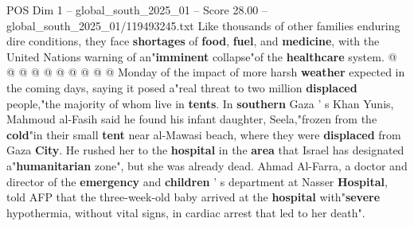\begin{textsample}{POS Dim 1 – global\_south\_2025\_01 – Score 28.00 – global\_south\_2025\_01/119493245.txt}
Like thousands of other families enduring dire conditions, they face \textbf{shortages} of \textbf{food}, \textbf{fuel}, and \textbf{medicine}, with the United Nations warning of an"\textbf{imminent} collapse"of the \textbf{healthcare} system. @ @ @ @ @ @ @ @ @ @ Monday of the impact of more harsh \textbf{weather} expected in the coming days, saying it posed a"real threat to two million \textbf{displaced} people,"the majority of whom live in \textbf{tents}.
In \textbf{southern} Gaza ' s Khan Yunis, Mahmoud al-Fasih said he found his infant daughter, Seela,"frozen from the \textbf{cold}"in their small \textbf{tent} near al-Mawasi beach, where they were \textbf{displaced} from Gaza \textbf{City}.
He rushed her to the \textbf{hospital} in the \textbf{area} that Israel has designated a"\textbf{humanitarian} zone", but she was already dead.
Ahmad Al-Farra, a doctor and director of the \textbf{emergency} and \textbf{children} ' s department at Nasser \textbf{Hospital}, told AFP that the three-week-old baby arrived at the \textbf{hospital} with"\textbf{severe} hypothermia, without vital signs, in cardiac arrest that led to her death".

\end{textsample}
